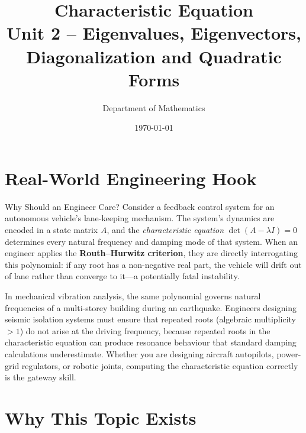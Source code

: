 \documentclass[12pt,a4paper]{article}
\title{\textbf{Characteristic Equation} \\ \large Unit 2 -- Eigenvalues, Eigenvectors, Diagonalization and Quadratic Forms}
\author{Department of Mathematics}
\date{\today}
\begin{document}
\maketitle
\tableofcontents
\newpage

\section{Real-World Engineering Hook}

\begin{curiositybox}{Why Should an Engineer Care?}
Consider a feedback control system for an autonomous vehicle's lane-keeping mechanism.
The system's dynamics are encoded in a state matrix $A$, and the \emph{characteristic equation}
$\det(A - \lambda I) = 0$ determines every natural frequency and damping mode of that system.
When an engineer applies the \textbf{Routh--Hurwitz criterion}, they are directly interrogating
this polynomial: if any root has a non-negative real part, the vehicle will drift out of lane
rather than converge to it---a potentially fatal instability.

In mechanical vibration analysis, the same polynomial governs natural frequencies of a
multi-storey building during an earthquake. Engineers designing seismic isolation systems
must ensure that repeated roots (algebraic multiplicity $> 1$) do not arise at the driving
frequency, because repeated roots in the characteristic equation can produce resonance
behaviour that standard damping calculations underestimate.
Whether you are designing aircraft autopilots, power-grid regulators, or robotic joints,
computing the characteristic equation correctly is the gateway skill.
\end{curiositybox}

\section{Why This Topic Exists}
\end{document}
